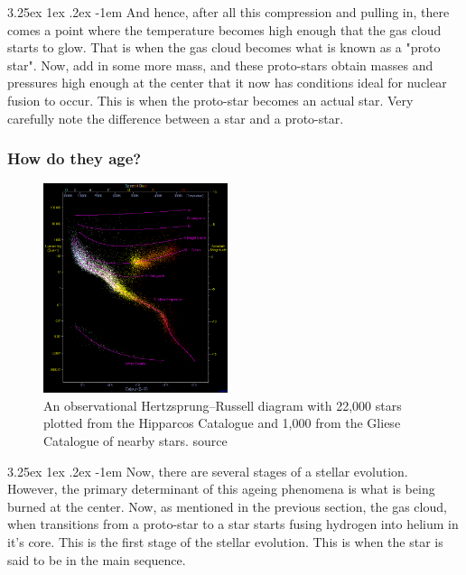 \documentclass[a4paper,twoside,11pt]{article}
\makeatletter
\numberwithin{equation}{section}
\renewcommand\paragraph{\@startsection{paragraph}{5}{\z@}%
  {3.25ex \@plus1ex \@minus.2ex}%
  {-1em}%
  {\normalfont\normalsize\bfseries}}
\makeatother
\begin{document}
\paragraph{}
And hence, after all this compression and pulling in, there comes a point where the temperature becomes high enough that the gas cloud starts to glow. That is when the gas cloud becomes what is known as a "proto star". Now, add in some more mass, and these proto-stars obtain masses and pressures high enough at the center that it now has conditions ideal for nuclear fusion to occur. This is when the proto-star becomes an actual star. Very carefully note the difference between a star and a proto-star. 
\subsubsection{How do they age?}
\begin{figure}
  \begin{center}
    \includegraphics[width=0.48\textwidth]{HRDiagram.png}
  \end{center}
  \caption{An observational Hertzsprung–Russell diagram with 22,000 stars plotted from the Hipparcos Catalogue and 1,000 from the Gliese Catalogue of nearby stars. source \cite{HRD}}
\end{figure}
\paragraph{}
Now, there are several stages of a stellar evolution. However, the primary determinant of this ageing phenomena is what is being burned at the center. Now, as mentioned in the previous section, the gas cloud, when transitions from a proto-star to a star starts fusing hydrogen into helium in it's core. This is the first stage of the stellar evolution. This is when the star is said to be in the main sequence. 
\end{document}
